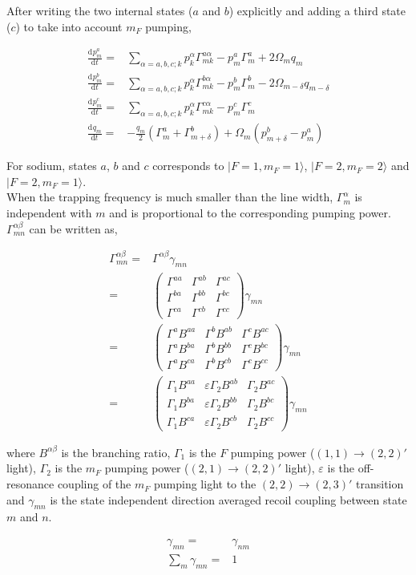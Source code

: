 \documentclass[10pt,fleqn]{article}
\newcommand{\ud}{\mathrm{d}}
\newcommand{\eqar}[1]
{
  \begin{align*}
    #1
  \end{align*}
}
\newcommand{\paren}[1]{{\left({#1}\right)}}
\newcommand{\diff}[3][{}]{{\frac{\ud^{#1} {#2}}{\ud {#3}{}^{#1}}}}
\begin{document}
After writing the two internal states ($a$ and $b$) explicitly and adding a third state ($c$) to take into account $m_F$ pumping,
\eqar{
  \diff{p^a_{m}}{t}=&\sum_{\alpha=a,b,c;k}p^\alpha_{k}\Gamma^{a\alpha}_{mk}-p^a_{m}\Gamma^a_{m}+2\Omega_{m}q_m\\
  \diff{p^b_{m}}{t}=&\sum_{\alpha=a,b,c;k}p^\alpha_{k}\Gamma^{b\alpha}_{mk}-p^b_{m}\Gamma^b_{m}-2\Omega_{m-\delta}q_{m-\delta}\\
  \diff{p^c_{m}}{t}=&\sum_{\alpha=a,b,c;k}p^\alpha_{k}\Gamma^{c\alpha}_{mk}-p^c_{m}\Gamma^c_{m}\\
  \diff{q_m}{t}=&-\frac{q_{m}}{2}\paren{\Gamma^a_{m}+\Gamma^b_{m+\delta}}+\Omega_{m}\paren{p^b_{m+\delta}-p^a_{m}}
}
For sodium, states $a$, $b$ and $c$ corresponds to $|F=1, m_F=1\rangle$, $|F=2, m_F=2\rangle$ and  $|F=2, m_F=1\rangle$.\\

When the trapping frequency is much smaller than the line width, $\Gamma^\alpha_m$ is independent with $m$ and is proportional to the corresponding pumping power. $\Gamma^{\alpha\beta}_{mn}$ can be written as,
\eqar{
  \Gamma^{\alpha\beta}_{mn}=&\Gamma^{\alpha\beta}\gamma_{mn}\\
  =&\begin{pmatrix}
    \Gamma^{aa}&\Gamma^{ab}&\Gamma^{ac}\\
    \Gamma^{ba}&\Gamma^{bb}&\Gamma^{bc}\\
    \Gamma^{ca}&\Gamma^{cb}&\Gamma^{cc}
  \end{pmatrix}\gamma_{mn}\\
  =&\begin{pmatrix}
    \Gamma^aB^{aa}&\Gamma^bB^{ab}&\Gamma^cB^{ac}\\
    \Gamma^aB^{ba}&\Gamma^bB^{bb}&\Gamma^cB^{bc}\\
    \Gamma^aB^{ca}&\Gamma^bB^{cb}&\Gamma^cB^{cc}
  \end{pmatrix}\gamma_{mn}\\
  =&\begin{pmatrix}
    \Gamma_1B^{aa}&\varepsilon\Gamma_2B^{ab}&\Gamma_2B^{ac}\\
    \Gamma_1B^{ba}&\varepsilon\Gamma_2B^{bb}&\Gamma_2B^{bc}\\
    \Gamma_1B^{ca}&\varepsilon\Gamma_2B^{cb}&\Gamma_2B^{cc}
  \end{pmatrix}\gamma_{mn}
}
where $B^{\alpha\beta}$ is the branching ratio, $\Gamma_1$ is the $F$ pumping power ($(1, 1) \rightarrow (2, 2)'$ light), $\Gamma_2$ is the $m_F$ pumping power ($(2, 1) \rightarrow (2, 2)'$ light), $\varepsilon$ is the off-resonance coupling of the $m_F$ pumping light to the $(2, 2) \rightarrow (2, 3)'$ transition and $\gamma_{mn}$ is the state independent direction averaged recoil coupling between state $m$ and $n$.
\eqar{
  \gamma_{mn}=&\gamma_{nm}\\
  \sum_{m}\gamma_{mn}=&1
}
\end{document}
